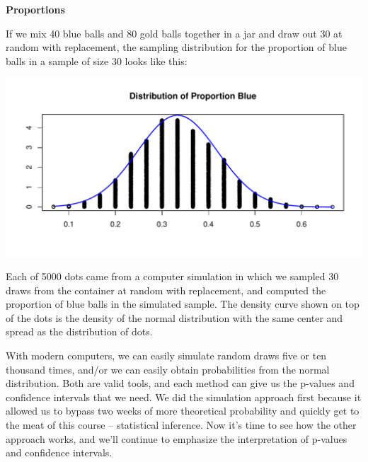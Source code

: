 \def\theTopic{Normal Proportions }
\def\dayNum{22 }


\begin{center}
   {\Large\bf  Proportions}
 \end{center}

If we mix 40 blue balls and 80 gold balls together in a jar and draw
out 30 at random with replacement, the sampling distribution for the
proportion of blue balls in a sample of size 30 looks like this:

\includegraphics[width=.8\linewidth]{../plots/sample1.pdf}

Each of 5000 dots came from a computer simulation in which we sampled
30 draws from the container at random with replacement, and computed
the proportion of blue balls in the simulated sample.  The density
curve shown on top of the dots is the density of the normal
distribution with the same center and spread as the distribution of
dots.

With modern computers, we can easily simulate random draws five or ten
thousand times, and/or we can easily obtain probabilities from the
normal distribution.  Both are valid tools, and each method can give
us the p-values and confidence intervals that we need.  We did the
simulation approach first because it allowed us to bypass two weeks of
more theoretical probability and quickly get to the meat of this
course -- statistical inference.  Now it's time to see how the other
approach works, and we'll continue to emphasize the interpretation of
p-values and confidence intervals.  



